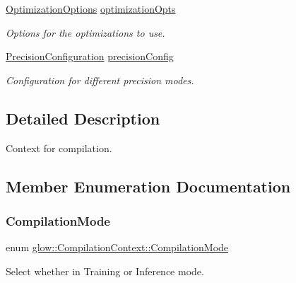 \begin{DoxyCompactItemize}
\hyperlink{structglow_1_1_optimization_options}{Optimization\+Options} \hyperlink{structglow_1_1_compilation_context_af9c1dd72e16ad800aefb856201324236}{optimization\+Opts}
\begin{DoxyCompactList}\small\item\em Options for the optimizations to use. \end{DoxyCompactList}\item 
\mbox{\label{structglow_1_1_compilation_context_a6133ffa65e66f4ec5c97cfc5de8e589d}} 
\hyperlink{structglow_1_1_precision_configuration}{Precision\+Configuration} \hyperlink{structglow_1_1_compilation_context_a6133ffa65e66f4ec5c97cfc5de8e589d}{precision\+Config}
\begin{DoxyCompactList}\small\item\em Configuration for different precision modes. \end{DoxyCompactList}\end{DoxyCompactItemize}


\subsection{Detailed Description}
Context for compilation. 

\subsection{Member Enumeration Documentation}
\mbox{\label{structglow_1_1_compilation_context_a92efb87746c0edf7756b84fdcd87014a}} 
\subsubsection{\texorpdfstring{Compilation\+Mode}{CompilationMode}}
{\footnotesize\ttfamily enum \hyperlink{structglow_1_1_compilation_context_a92efb87746c0edf7756b84fdcd87014a}{glow\+::\+Compilation\+Context\+::\+Compilation\+Mode}\hspace{0.3cm}{\ttfamily [strong]}}



Select whether in Training or Inference mode. 

